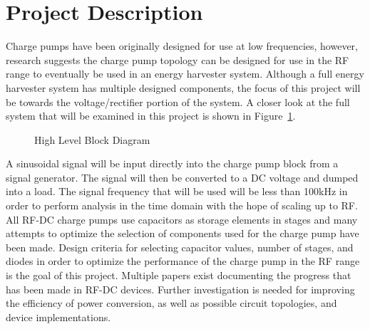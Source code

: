 \documentclass[12pt]{article}
\begin{document}
\section{Project Description}
Charge pumps have been originally designed for use at low frequencies, however, research suggests the charge pump topology can be designed for use in the RF range to eventually be used in an energy harvester system. Although a full energy harvester system has multiple designed components, the focus of this project will be towards the voltage/rectifier portion of the system. A closer look at the full system that will be examined in this project is shown in Figure~\ref{fig:HighLevel}.
	
\begin{figure}[H]
\caption{High Level Block Diagram}
\label{fig:HighLevel}
\end{figure}
	
\noindent A sinusoidal signal will be input directly into the charge pump block from a signal generator. The signal will then be converted to a DC voltage and dumped into a load. The signal frequency that will be used will be less than 100kHz in order to perform analysis in the time domain with the hope of scaling up to RF. \\

\noindent All RF-DC charge pumps use capacitors as storage elements in stages and many attempts to optimize the selection of components used for the charge pump have been made. Design criteria for selecting capacitor values, number of stages, and diodes in order to optimize the performance of the charge pump in the RF range is the goal of this project. Multiple papers exist documenting the progress that has been made in RF-DC devices. Further investigation is needed for improving the efficiency of power conversion, as well as possible circuit topologies, and device implementations. 
	
\end{document}
